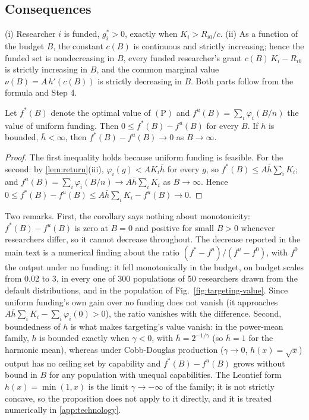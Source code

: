 \subsection*{Consequences}

\begin{corollary}\label{cor:frontier}
(i) Researcher $i$ is funded, $g_i^* > 0$, exactly when $K_i > R_{i0}/c$. (ii) As a function of the budget $B$, the constant $c(B)$ is continuous and strictly increasing; hence the funded set is nondecreasing in $B$, every funded researcher's grant $c(B)\,K_i - R_{i0}$ is strictly increasing in $B$, and the common marginal value $\nu(B) = A\,h'(c(B))$ is strictly decreasing in $B$. Both parts follow from the formula and Step 4.
\end{corollary}
\begin{corollary}\label{cor:targeting-vanishes}
Let $f^*(B)$ denote the optimal value of $(\mathrm{P})$ and $f^u(B) = \sum_i \varphi_i(B/n)$ the value of uniform funding. Then $0 \leq f^*(B) - f^u(B)$ for every $B$. If $h$ is bounded, $\bar h < \infty$, then $f^*(B) - f^u(B) \to 0$ as $B \to \infty$.
\end{corollary}

\begin{proof}
The first inequality holds because uniform funding is feasible. For the second: by \cref{lem:return}(iii), $\varphi_i(g) < A K_i \bar h$ for every $g$, so $f^*(B) \leq A\bar h\sum_i K_i$; and $f^u(B) = \sum_i \varphi_i(B/n) \to A\bar h\sum_i K_i$ as $B \to \infty$. Hence $0 \leq f^*(B) - f^u(B) \leq A\bar h\sum_i K_i - f^u(B) \to 0$.
\end{proof}

Two remarks. First, the corollary says nothing about monotonicity: $f^*(B) - f^u(B)$ is zero at $B = 0$ and positive for small $B > 0$ whenever researchers differ, so it cannot decrease throughout. The decrease reported in the main text is a numerical finding about the ratio $(f^* - f^u)/(f^u - f^0)$, with $f^0$ the output under no funding: it fell monotonically in the budget, on budget scales from $0.02$ to $3$, in every one of 300 populations of 50 researchers drawn from the default distributions, and in the population of Fig.~\ref{fig:targeting-value}. Since uniform funding's own gain over no funding does not vanish (it approaches $A\bar h\sum_i K_i - \sum_i \varphi_i(0) > 0$), the ratio vanishes with the difference. Second, boundedness of $h$ is what makes targeting's value vanish: in the power-mean family, $h$ is bounded exactly when $\gamma < 0$, with $\bar h = 2^{-1/\gamma}$ (so $\bar h = 1$ for the harmonic mean), whereas under Cobb-Douglas production ($\gamma \to 0$, $h(x) = \sqrt{x}$) output has no ceiling set by capability and $f^*(B) - f^u(B)$ grows without bound in $B$ for any population with unequal capabilities. The Leontief form $h(x) = \min(1, x)$ is the limit $\gamma \to -\infty$ of the family; it is not strictly concave, so the proposition does not apply to it directly, and it is treated numerically in \ref{app:technology}.

